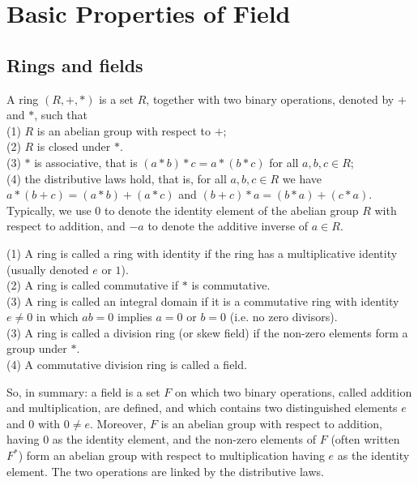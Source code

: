 \chapter{Basic Properties of Field}\label{chp:6_1}

\section{Rings and fields}

\begin{definition}{}{}
    A ring $(R,+,*)$ is a set $R$,
    together with two binary operations, denoted by $+$ and $*$,
    such that\\
    (1) $R$ is an abelian group with respect to $+$;\\
    (2) $R$ is closed under $*$.\\
    (3) $*$ is associative, that is $(a*b)*c=a*(b*c)$ for all $a,b,c\in R$;\\
    (4) the distributive laws hold, that is, for all $a,b,c\in R$ we have $a*(b+c)=(a*b)+(a*c)$
    and $(b+c)*a=(b*a)+(c*a)$.\\
    Typically, we use $0$ to denote the identity element of the abelian group $R$ with respect to addition,
    and $-a$ to denote the additive inverse of $a\in R$.
\end{definition}

\begin{definition}{}{}
    (1) A ring is called a ring with identity if the ring has a multiplicative identity (usually denoted $e$ or $1$).\\
    (2) A ring is called commutative if $*$ is commutative.\\
    (3) A ring is called an integral domain if it is a commutative ring with identity $e \neq 0$ in which
    $ab = 0$ implies $a = 0$ or $b = 0$ (i.e. no zero divisors).\\
    (3) A ring is called a division ring (or skew field) if the non-zero elements form a group under $*$.\\
    (4) A commutative division ring is called a field.
\end{definition}

So, in summary: a field is a set $F$ on which two binary operations, called addition and multiplication, 
are defined, and which contains two distinguished elements $e$ and $0$ with $0 \neq e$. 
Moreover, $F$ is an abelian group with respect to addition, having $0$ as the identity element, 
and the non-zero elements of $F$ (often written $F^*$) 
form an abelian group with respect to multiplication having $e$ as
the identity element. 
The two operations are linked by the distributive laws.


